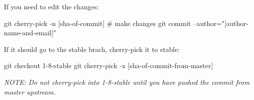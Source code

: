 If you need to edit the changes\-: \begin{DoxyVerb}git cherry-pick -n [sha-of-commit]
# make changes
git commit --author="[author-name-and-email]"
\end{DoxyVerb}


If it should go to the stable brach, cherry-\/pick it to stable\-: \begin{DoxyVerb}git checkout 1-8-stable
git cherry-pick -x [sha-of-commit-from-master]
\end{DoxyVerb}


{\itshape N\-O\-T\-E\-: Do not cherry-\/pick into 1-\/8-\/stable until you have pushed the commit from master upstream.} 